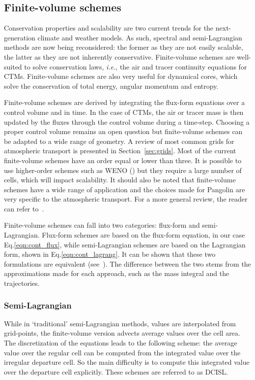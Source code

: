 \subsection{Finite-volume schemes}
\label{subsec:fv_schemes}
Conservation properties and scalability are two current trends for the
next-generation climate and weather models. As such, spectral and
semi-Lagrangian methods are now being reconsidered: the former as they are not
easily scalable, the latter as they are not inherently conservative.
Finite-volume schemes are well-suited to solve conservation laws, \textit{i.e.},
the air and tracer continuity equations for CTMs. Finite-volume schemes are also
very useful for dynamical cores, which solve the conservation of total energy,
angular momentum and entropy.

Finite-volume schemes are derived by integrating the flux-form equations over a
control volume and in time. In the case of CTMs, the air or tracer mass is then
updated by the fluxes through the control volume during a time-step. Choosing a
proper control volume remains an open question but finite-volume schemes can be
adapted to a wide range of geometry. A review of most common grids for
atmospheric transport is presented in Section~\ref{sec:grids}.
Most of the current finite-volume schemes have an order equal or lower than
three. It is possible to use higher-order schemes such as WENO
(\cite{Jiang1999}) but they require a large number of cells, which will impact
scalability. It should also be noted that finite-volume schemes have a wide
range of application and the choices made for Pangolin are very specific to the
atmospheric transport. For a more general review, the reader can refer
to~\cite{LeVeque2002}.

Finite-volume schemes can fall into two categories: flux-form and
semi-Lagrangian. Flux-form schemes are based on the flux-form equation, in our
case Eq.\eqref{eqn:cont_flux}, while semi-Lagrangian schemes are based on the
Lagrangian form, shown in Eq.\eqref{eqn:cont_lagrang}. It can be shown that
these two formulations are equivalent (see~\cite{Machenhauer2009}). The
difference between the two stems from the approximations made for each approach,
such as the mass integral and the trajectories.

\subsubsection{Semi-Lagrangian }
\label{subsub:cisl}
While in `traditional' semi-Lagrangian methods, values are interpolated from
grid-points, the finite-volume version advects average values over the cell
area. The discretization of the equations leads to the following scheme: the
average value over the regular cell can be computed from the integrated value
over the irregular departure cell. So the main difficulty is to compute this
integrated value over the departure cell explicitly. These schemes are referred
to as \gls{DCISL}. 

